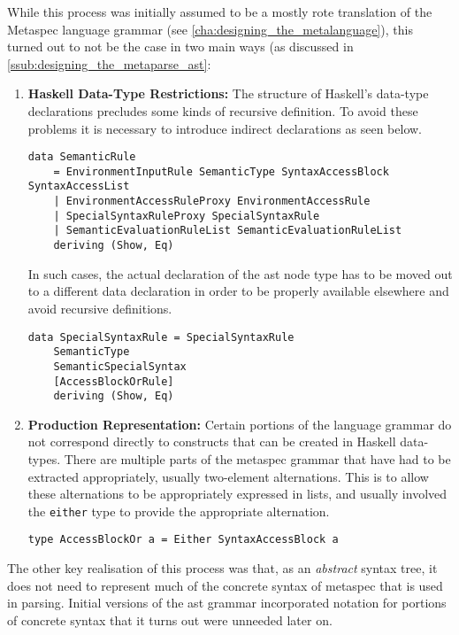 While this process was initially assumed to be a mostly rote translation of the Metaspec language grammar (see \autoref{cha:designing_the_metalanguage}), this turned out to not be the case in two main ways (as discussed in \autoref{ssub:designing_the_metaparse_ast}:
\begin{enumerate}
    \item \textbf{Haskell Data-Type Restrictions:} The structure of Haskell's data-type declarations precludes some kinds of recursive definition.
    To avoid these problems it is necessary to introduce indirect declarations as seen below.
\begin{verbatim}
data SemanticRule
    = EnvironmentInputRule SemanticType SyntaxAccessBlock SyntaxAccessList
    | EnvironmentAccessRuleProxy EnvironmentAccessRule
    | SpecialSyntaxRuleProxy SpecialSyntaxRule
    | SemanticEvaluationRuleList SemanticEvaluationRuleList
    deriving (Show, Eq)
\end{verbatim}
    In such cases, the actual declaration of the \gls{ast} node type has to be moved out to a different data declaration in order to be properly available elsewhere and avoid recursive definitions.
\begin{verbatim}
data SpecialSyntaxRule = SpecialSyntaxRule
    SemanticType
    SemanticSpecialSyntax
    [AccessBlockOrRule]
    deriving (Show, Eq)
\end{verbatim}
    \item \textbf{Production Representation:} Certain portions of the language grammar do not correspond directly to constructs that can be created in Haskell data-types.
    There are multiple parts of the \gls{metaspec} grammar that have had to be extracted appropriately, usually two-element alternations.
    This is to allow these alternations to be appropriately expressed in lists, and usually involved the \texttt{either} type to provide the appropriate alternation.
\begin{verbatim}
type AccessBlockOr a = Either SyntaxAccessBlock a
\end{verbatim}
\end{enumerate}

The other key realisation of this process was that, as an \textit{abstract} syntax tree, it does not need to represent much of the concrete syntax of \gls{metaspec} that is used in parsing. 
Initial versions of the \gls{ast} grammar incorporated notation for portions of concrete syntax that it turns out were unneeded later on. 

